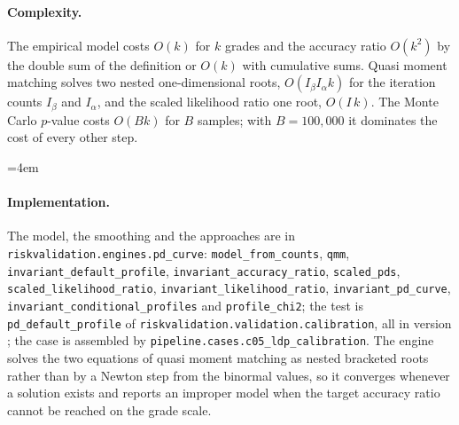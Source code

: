 \paragraph{Complexity.} The empirical model costs $O(k)$ for $k$ grades and the accuracy ratio $O(k^2)$ by the double sum of the definition or $O(k)$ with cumulative sums. Quasi moment matching solves two nested one-dimensional roots, $O(I_\beta I_\alpha k)$ for the iteration counts $I_\beta$ and $I_\alpha$, and the scaled likelihood ratio one root, $O(I\,k)$. The Monte Carlo $p$-value costs $O(Bk)$ for $B$ samples; with $B=100{,}000$ it dominates the cost of every other step.

{\emergencystretch=4em \paragraph{Implementation.} The model, the smoothing and the approaches are in \texttt{riskvalidation.\allowbreak{}engines.\allowbreak{}pd\_\allowbreak{}curve}: \texttt{model\_\allowbreak{}from\_\allowbreak{}counts}, \texttt{qmm}, \texttt{invariant\_\allowbreak{}default\_\allowbreak{}profile}, \texttt{invariant\_\allowbreak{}accuracy\_\allowbreak{}ratio}, \texttt{scaled\_\allowbreak{}pds}, \texttt{scaled\_\allowbreak{}likelihood\_\allowbreak{}ratio}, \texttt{invariant\_\allowbreak{}likelihood\_\allowbreak{}ratio}, \texttt{invariant\_\allowbreak{}pd\_\allowbreak{}curve}, \texttt{invariant\_\allowbreak{}conditional\_\allowbreak{}profiles} and \texttt{profile\_\allowbreak{}chi2}; the test is \texttt{pd\_\allowbreak{}default\_\allowbreak{}profile} of \texttt{riskvalidation.\allowbreak{}validation.\allowbreak{}calibration}, all in version \rtgRvVersion{}; the case is assembled by \texttt{pipeline.\allowbreak{}cases.\allowbreak{}c05\_\allowbreak{}ldp\_\allowbreak{}calibration}. The engine solves the two equations of quasi moment matching as nested bracketed roots rather than by a Newton step from the binormal values, so it converges whenever a solution exists and reports an improper model when the target accuracy ratio cannot be reached on the grade scale.\par}

